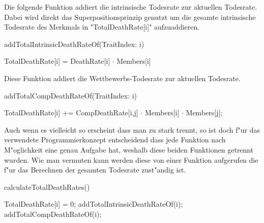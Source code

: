 \documentclass[11pt, a4paper, german]{article}
\theoremstyle{plain}
\begin{document}
	Die folgende Funktion addiert die intrinsische Todesrate zur aktuellen Todesrate. Dabei wird direkt das Superpositionsprinzip genutzt um die gesamte intrinsische Todesrate des Merkmals in "{}TotalDeathRate[i]"{} aufzuaddieren.
	\begin{algorithm}[H]
		\caption{addTotalIntrinsicDeathRateOf(TraitIndex: i)}
		\begin{algorithmic}[1]
			\STATE TotalDeathRate[i] = DeathRate[i] $ \cdot $ Members[i]
		\end{algorithmic}
	\end{algorithm}
	Diese Funktion addiert die Wettbewerbs-Todesrate zur aktuellen Todesrate.
	\begin{algorithm}[H]
		\caption{addTotalCompDeathRateOf(TraitIndex: i)}
		\begin{algorithmic}[1]
				\STATE TotalDeathRate[i] += CompDeathRate[i,j] $ \cdot $ Members[i] $ \cdot $ Members[j];
			\ENDFOR
		\end{algorithmic}
	\end{algorithm}
	Auch wenn es vielleicht so erscheint dass man zu stark trennt, so ist doch f"ur das verwendete Programmierkonzept entscheidend dass jede Funktion nach M"oglichkeit eine genau Aufgabe hat, weshalb diese beiden Funktionen getrennt wurden. Wie man vermuten kann werden diese von einer Funktion aufgerufen die f"ur das Berechnen der gesamten Todesrate zust"andig ist.
	\begin{algorithm}[H]
		\caption{calculateTotalDeathRates()}
		\begin{algorithmic}[1]
				\STATE TotalDeathRate[i] = 0;
				\STATE addTotalIntrinsicDeathRateOf(i);
				\STATE addTotalCompDeathRateOf(i);
			\ENDFOR
		\end{algorithmic}
	\end{algorithm}
	
\end{document}
